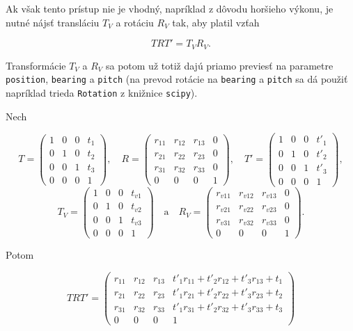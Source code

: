 Ak však tento prístup nie je vhodný, napríklad z dôvodu horšieho výkonu, je nutné nájsť transláciu $T_V$ a rotáciu $R_V$ tak, aby platil vzťah 

$$ T R T' = T_V R_V \mathrm{.}$$

Transformácie $T_V$ a $R_V$ sa potom už totiž dajú priamo previesť na parametre \texttt{position}, \texttt{bearing} a \texttt{pitch} (na prevod rotácie na \texttt{bearing} a \texttt{pitch} sa dá použiť napríklad trieda \texttt{Rotation} z knižnice \texttt{scipy}).

Nech

$$
    T =
    \begin{pmatrix}
    1 & 0 & 0 & t_1 \\
    0 & 1 & 0 & t_2 \\
    0 & 0 & 1 & t_3 \\
    0 & 0 & 0 & 1
    \end{pmatrix}
    \mathrm{,} \quad 
    R =
    \begin{pmatrix}
    r_{11} & r_{12} & r_{13} & 0 \\
    r_{21} & r_{22} & r_{23} & 0 \\
    r_{31} & r_{32} & r_{33} & 0 \\
    0 & 0 & 0 & 1
    \end{pmatrix}
    \mathrm{,} \quad 
    T' =
    \begin{pmatrix}
    1 & 0 & 0 & t'_1 \\
    0 & 1 & 0 & t'_2 \\
    0 & 0 & 1 & t'_3 \\
    0 & 0 & 0 & 1
    \end{pmatrix}
    \mathrm{,}
$$
$$
    T_V =
    \begin{pmatrix}
    1 & 0 & 0 & t_{v1} \\
    0 & 1 & 0 & t_{v2} \\
    0 & 0 & 1 & t_{v3} \\
    0 & 0 & 0 & 1
    \end{pmatrix}
    \quad \mathrm{a} \quad 
    R_V =
    \begin{pmatrix}
    r_{v11} & r_{v12} & r_{v13} & 0 \\
    r_{v21} & r_{v22} & r_{v23} & 0 \\
    r_{v31} & r_{v32} & r_{v33} & 0 \\
    0 & 0 & 0 & 1
    \end{pmatrix}
    \mathrm{.}
$$

Potom

$$
    T R T' =
    \begin{pmatrix}
    r_{11} & r_{12} & r_{13} & t'_1 r_{11} + t'_2 r_{12} + t'_3 r_{13} + t_1 \\
    r_{21} & r_{22} & r_{23} &  t'_1 r_{21} + t'_2 r_{22} + t'_3 r_{23} + t_2 \\
    r_{31} & r_{32} & r_{33} &  t'_1 r_{31} + t'_2 r_{32} + t'_3 r_{33} + t_3 \\
    0 & 0 & 0 & 1
    \end{pmatrix}
$$

